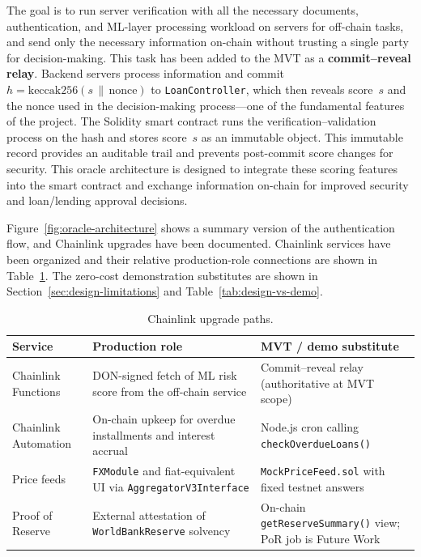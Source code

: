 The goal is to run server verification with all the necessary documents, authentication, and ML-layer processing workload on servers for off-chain tasks, and send only the necessary information on-chain without trusting a single party for decision-making. This task has been added to the MVT as a \textbf{commit--reveal relay}. Backend servers process information and commit $h = \text{keccak256}(s \,\|\, \text{nonce})$ to \texttt{LoanController}, which then reveals score~$s$ and the nonce used in the decision-making process---one of the fundamental features of the project. The Solidity smart contract runs the verification--validation process on the hash and stores score~$s$ as an immutable object. This immutable record provides an auditable trail and prevents post-commit score changes for security. This oracle architecture is designed to integrate these scoring features into the smart contract and exchange information on-chain for improved security and loan/lending approval decisions.

Figure~\ref{fig:oracle-architecture} shows a summary version of the authentication flow, and Chainlink upgrades have been documented. Chainlink services have been organized and their relative production-role connections are shown in Table~\ref{tab:chainlink-upgrade-paths}. The zero-cost demonstration substitutes are shown in Section~\ref{sec:design-limitations} and Table~\ref{tab:design-vs-demo}.

\begin{table}[H]
\centering
\caption[Chainlink upgrade paths]{Chainlink upgrade paths.}
\label{tab:chainlink-upgrade-paths}
\small
\begin{tabular}{@{}p{2.6cm}p{4.8cm}p{5.8cm}@{}}
\toprule
\tableheadcolor
\textbf{Service} & \textbf{Production role} & \textbf{MVT / demo substitute} \\
\midrule
Chainlink Functions &
  DON-signed fetch of ML risk score from the off-chain service &
  Commit--reveal relay (authoritative at MVT scope) \\
\rowcolor{RowShade}
Chainlink Automation &
  On-chain upkeep for overdue installments and interest accrual &
  Node.js cron calling \texttt{checkOverdueLoans()} \\
Price feeds &
  \texttt{FXModule} and fiat-equivalent UI via \texttt{AggregatorV3Interface} &
  \texttt{MockPriceFeed.sol} with fixed testnet answers \\
\rowcolor{RowShade}
Proof of Reserve &
  External attestation of \texttt{WorldBankReserve} solvency &
  On-chain \texttt{getReserveSummary()} view; PoR job is Future Work \\
\bottomrule
\end{tabular}
\end{table}

